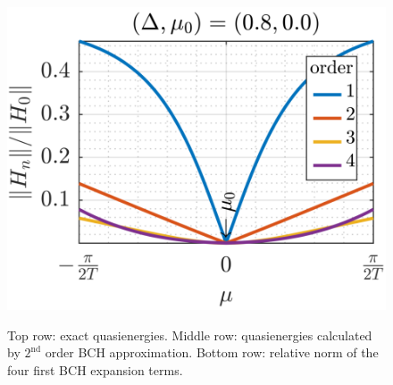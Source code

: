 \documentclass[11pt]{report}
\begin{document}
\begin{figure}
\includegraphics[scale=1]{Figures/New/Expansion_Amplitude2.png}\\
\caption{Top row: exact quasienergies. Middle row: quasienergies calculated by $2^{\text{nd}}$ order BCH approximation. Bottom row: relative norm of the four first BCH expansion terms.}
\label{Fig:4}
\end{figure}
\end{document}
